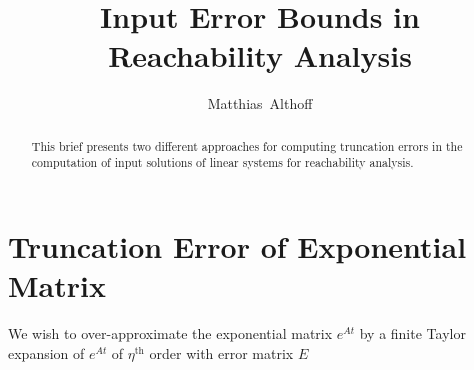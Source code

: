 \documentclass{amsproc}
\renewcommand{\^}[1]{^{(#1)}}
\begin{document}
\title[Input Error Bounds in Reachability Analysis]{Input Error Bounds in Reachability Analysis}


\author{Matthias~Althoff}
\address{Department of Computer Science, Technische Universit\"at M\"unchen, 85748 Garching, Germany}



\begin{abstract}
 This brief presents two different approaches for computing truncation errors in the computation of input solutions of linear systems for reachability analysis.
\end{abstract}


\maketitle







\section{Truncation Error of Exponential Matrix} 

We wish to over-approximate the exponential matrix $e^{At}$ by a finite Taylor expansion of $e^{At}$ of $\eta^{\text{th}}$ order with error matrix $E$ 
\end{document}
